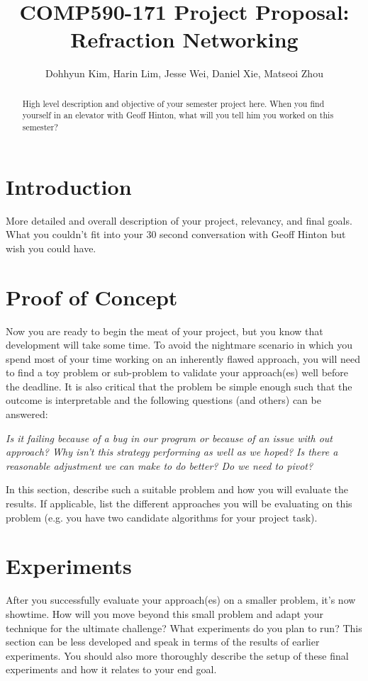 \documentclass{article}
\title{COMP590-171 Project Proposal: Refraction Networking}
\author{
    Dohhyun Kim, Harin Lim, Jesse Wei, Daniel Xie, Matseoi Zhou
}
\begin{document}
\maketitle

\begin{abstract}
High level description and objective of your semester project here. When you find yourself in an elevator with Geoff Hinton, what will you tell him you worked on this semester?
\end{abstract}

\section{Introduction}
More detailed and overall description of your project, relevancy, and final goals. What you couldn't fit into your 30 second conversation with Geoff Hinton but wish you could have.

\section{Proof of Concept}
Now you are ready to begin the meat of your project, but you know that development will take some time. To avoid the nightmare scenario in which you spend most of your time working on an inherently flawed approach, you will need to find a toy problem or sub-problem to validate your approach(es) well before the deadline. It is also critical that the problem be simple enough such that the outcome is interpretable and the following questions (and others) can be answered:

\textit{Is it failing because of a bug in our program or because of an issue with out approach? Why isn't this strategy performing as well as we hoped? Is there a reasonable adjustment we can make to do better? Do we need to pivot?}

In this section, describe such a suitable problem and how you will evaluate the results. If applicable, list the different approaches you will be evaluating on this problem (e.g. you have two candidate algorithms for your project task).

\section{Experiments}

After you successfully evaluate your approach(es) on a smaller problem, it's now showtime. How will you move beyond this small problem and adapt your technique for the ultimate challenge? What experiments do you plan to run? This section can be less developed and speak in terms of the results of earlier experiments. You should also more thoroughly describe the setup of these final experiments and how it relates to your end goal.
\end{document}
